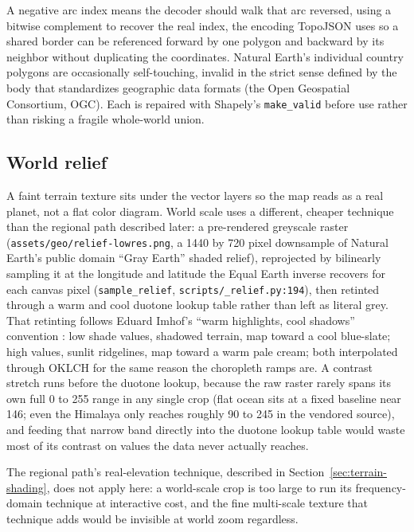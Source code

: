 \documentclass[11pt]{article}
\begin{document}
A negative arc index means the decoder should walk that arc reversed,
using a bitwise complement to recover the real index, the encoding
TopoJSON uses so a shared border can be referenced forward by one
polygon and backward by its neighbor without duplicating the
coordinates. Natural Earth's individual country polygons are
occasionally self-touching, invalid in the strict sense defined by the
body that standardizes geographic data formats (the Open Geospatial
Consortium, OGC). Each is repaired with Shapely's \texttt{make\_valid}
before use rather than risking a fragile whole-world union.

\subsection{World relief}

A faint terrain texture sits under the vector layers so the map reads
as a real planet, not a flat color diagram. World scale uses a
different, cheaper technique than the regional path described later: a
pre-rendered greyscale raster (\texttt{assets/geo/relief-lowres.png}, a
1440 by 720 pixel downsample of Natural Earth's public domain ``Gray
Earth'' shaded relief), reprojected by bilinearly sampling it at the
longitude and latitude the Equal Earth inverse recovers for each canvas
pixel (\texttt{sample\_relief}, \texttt{scripts/\_relief.py:194}), then
retinted through a warm and cool duotone lookup table rather than left
as literal grey. That retinting follows Eduard Imhof's ``warm
highlights, cool shadows'' convention \autocite{imhof-relief}: low shade
values, shadowed terrain, map toward a cool blue-slate; high values,
sunlit ridgelines, map toward a warm pale cream; both interpolated
through OKLCH for the same reason the choropleth ramps are. A contrast
stretch runs before the duotone lookup, because the raw raster rarely
spans its own full 0 to 255 range in any single crop (flat ocean sits
at a fixed baseline near 146; even the Himalaya only reaches roughly 90
to 245 in the vendored source), and feeding that narrow band directly
into the duotone lookup table would waste most of its contrast on
values the data never actually reaches.

The regional path's real-elevation technique, described in
Section~\ref{sec:terrain-shading}, does not apply here: a world-scale
crop is too large to run its frequency-domain technique at interactive
cost, and the fine multi-scale texture that technique adds would be
invisible at world zoom regardless.
\end{document}
